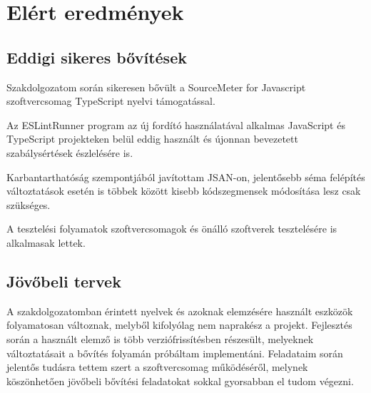 \chapter{Elért eredmények}
\label{chap:fejezet6}

\section{Eddigi sikeres bővítések}

Szakdolgozatom során sikeresen bővült a SourceMeter for Javascript szoftvercsomag TypeScript nyelvi támogatással. 

Az ESLintRunner program az új fordító használatával alkalmas JavaScript és TypeScript projekteken belül eddig használt és újonnan bevezetett szabálysértések 
észlelésére is.

Karbantarthatóság szempontjából javítottam JSAN-on, jelentősebb séma felépítés változtatások esetén is többek között kisebb kódszegmensek módosítása lesz csak szükséges.

A tesztelési folyamatok szoftvercsomagok és önálló szoftverek tesztelésére is alkalmasak lettek.

\section{Jövőbeli tervek}

A szakdolgozatomban érintett nyelvek és azoknak elemzésére használt eszközök folyamatosan változnak, melyből kifolyólag nem naprakész a projekt. Fejlesztés során a használt elemző \cite{typescript-eslint} is több verziófrissítésben részesült, melyeknek változtatásait a bővítés folyamán próbáltam implementáni.
Feladataim során jelentős tudásra tettem szert a szoftvercsomag működéséről, melynek köszönhetően jövőbeli bővítési feladatokat sokkal gyorsabban el tudom végezni.